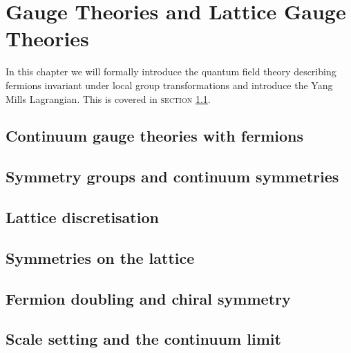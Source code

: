 \chapter{Gauge Theories and Lattice Gauge Theories}

In this chapter we will formally introduce the quantum field theory describing
fermions invariant under local group transformations and introduce the Yang
Mills Lagrangian. This is covered in \textsc{section} \ref{sec:continuum_gauge}.

\section{Continuum gauge theories with fermions} \label{sec:continuum_gauge}
\section{Symmetry groups and continuum symmetries} \label{sec:symmetries}
\section{Lattice discretisation} \label{sec:lattice_intro}
\section{Symmetries on the lattice} \label{sec:lattice_symmetries}
\section{Fermion doubling and chiral symmetry} \label{sec:fermion_doubling}
\section{Scale setting and the continuum limit} \label{sec:scale_setting}
